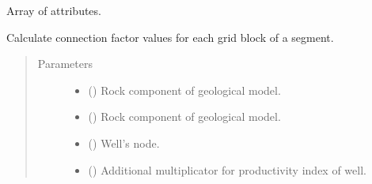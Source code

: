 \documentclass[letterpaper,10pt,english]{sphinxmanual}
\begin{document}
\begin{fulllineitems}
\begin{fulllineitems}
\begin{quote}
\begin{description}
\end{description}\end{quote}

\end{fulllineitems}


\begin{fulllineitems}
\label{\detokenize{api/wells:geology.src.wells.WellSegment.attributes}}
Array of attributes.

\end{fulllineitems}


\begin{fulllineitems}
\label{\detokenize{api/wells:geology.src.wells.WellSegment.calculate_cf}}
Calculate connection factor values for each grid block of a segment.
\begin{quote}\begin{description}
\item[{Parameters}] \leavevmode\begin{itemize}
\item {} 
 ({\hyperref[\detokenize{api/rock:geology.src.Rock}]{}}) \textendash{} Rock component of geological model.

\item {} 
 ({\hyperref[\detokenize{api/grids:geology.src.Grid}]{}}) \textendash{} Rock component of geological model.

\item {} 
 ({\hyperref[\detokenize{api/wells:geology.src.wells.WellSegment}]{}}) \textendash{} Well’s node.

\item {} 
 () \textendash{} Additional multiplicator for productivity index of well.


\end{itemize}
\end{description}
\end{quote}
\end{fulllineitems}
\end{fulllineitems}
\end{document}
